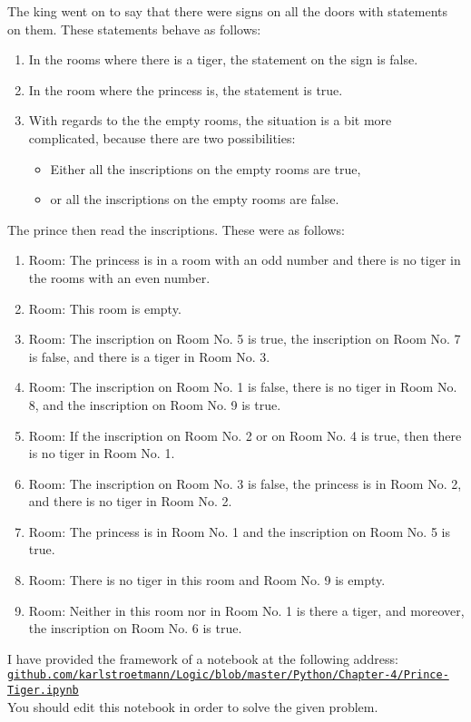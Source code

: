 The king went on to say that there were signs on all the doors with statements on them. These statements behave as follows:
\begin{enumerate}
\item In the rooms where there is a tiger, the statement on the sign is false.
\item In the room where the princess is, the statement is true.
\item With regards to the the empty rooms, the situation is a bit more
      complicated, because there are two possibilities:
      \begin{itemize}
      \item Either all the inscriptions on the empty rooms are true,
      \item or all the inscriptions on the empty rooms are false.
      \end{itemize}

\end{enumerate}
The prince then read the inscriptions. These were as follows:
\begin{enumerate}
\item Room: The princess is in a room with an odd number and
      there is no tiger in the rooms with an even number.
\item Room: This room is empty.
\item Room: The inscription on Room No. 5 is true, the inscription on Room No. 7 is false,
      and there is a tiger in Room No. 3.
\item Room: The inscription on Room No. 1 is false, there is no tiger in Room No. 8,
      and the inscription on Room No. 9 is true.
\item Room: If the inscription on Room No. 2 or on Room No. 4 is true,
      then there is no tiger in Room No. 1.
\item Room: The inscription on Room No. 3 is false, the princess is in Room No. 2,
      and there is no tiger in Room No. 2.
\item Room: The princess is in Room No. 1 and the inscription on Room No. 5 is true.
\item Room: There is no tiger in this room and Room No. 9 is empty.
\item Room: Neither in this room nor in Room No. 1 is there a tiger, and moreover, the
      inscription on Room No. 6 is true.
\end{enumerate} 
I have provided the framework of a notebook at the following address:
\\[0.2cm]
\hspace*{1.3cm}
\href{https://github.com/karlstroetmann/Logic/blob/master/Python/Chapter-4/Prince-Tiger.ipynb}{\texttt{github.com/karlstroetmann/Logic/blob/master/Python/Chapter-4/Prince-Tiger.ipynb}}
\\[0.2cm]
You should edit this notebook in order to solve the given problem. \eox
\vspace*{1cm}

